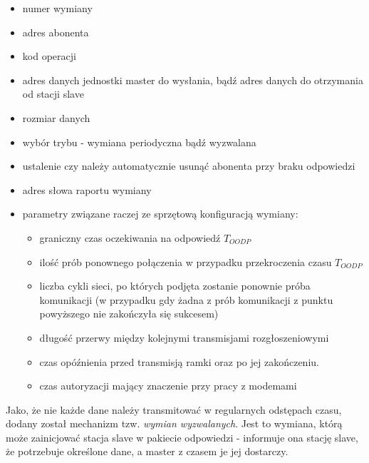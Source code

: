 	\begin{itemize}
		\item numer wymiany
		\item adres abonenta
		\item kod operacji
		\item adres danych jednostki master do wysłania, bądź adres danych do otrzymania od stacji slave
		\item rozmiar danych
		\item wybór trybu - wymiana periodyczna bądź wyzwalana
		\item ustalenie czy należy automatycznie usunąć abonenta przy braku odpowiedzi
		\item adres słowa raportu wymiany
		\item parametry związane raczej ze sprzętową konfiguracją wymiany:
		\begin{itemize}
			\item graniczny czas oczekiwania na odpowiedź $ T_{OODP} $
			\item ilość prób ponownego połączenia w przypadku przekroczenia czasu $ T_{OODP} $
			\item liczba cykli sieci, po których podjęta zostanie ponownie próba komunikacji (w przypadku gdy żadna z prób komunikacji z punktu powyższego nie zakończyła się sukcesem)
			\item długość przerwy między kolejnymi transmisjami rozgłoszeniowymi
			\item czas opóźnienia przed transmisją ramki oraz po jej zakończeniu.
			\item czas autoryzacji mający znaczenie przy pracy z modemami
		\end{itemize}
	\end{itemize}
	Jako, że nie każde dane należy transmitować w regularnych odstępach czasu, dodany został mechanizm tzw. \textit{wymian wyzwalanych}. Jest to wymiana, którą może zainicjować stacja slave w pakiecie odpowiedzi - informuje ona stację slave, że potrzebuje określone dane, a master z czasem je jej dostarczy.
